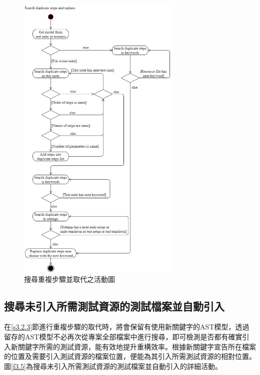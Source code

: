 \begin{figure}[H]
    \centering
    \includegraphics[width=0.7\textwidth]{picture/Search_duplicate_steps_and_replace.png}
    \caption{搜尋重複步驟並取代之活動圖}
    \label{f3.4}
\end{figure}

\subsection{搜尋未引入所需測試資源的測試檔案並自動引入}\label{s3.2.4}
\indent
在\ref{s3.2.3}節進行重複步驟的取代時，將會保留有使用新關鍵字的AST模型，透過留存的AST模型不必再次從專案全部檔案中進行搜尋，即可檢測是否都有確實引入新關鍵字所需的測試資源，能有效地提升重構效率。根據新關鍵字宣告所在檔案的位置及需要引入測試資源的檔案位置，便能為其引入所需測試資源的相對位置。圖\ref{f3.5}為搜尋未引入所需測試資源的測試檔案並自動引入的詳細活動。

